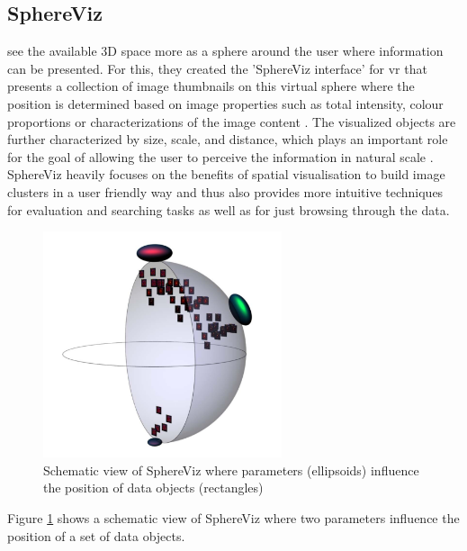 
\subsection{SphereViz}

\cite{Soldati2007} see the available 3D space more as a sphere around the user where information can be presented. For this, they created the 'SphereViz interface' for \gls{vr} that presents a collection of image thumbnails on this virtual sphere where the position is determined based on image properties such as total intensity, colour proportions or characterizations of the image content \citep{Soldati2007}. The visualized objects are further characterized by size, scale, and distance, which plays an important role for the goal of allowing the user to perceive the information in natural scale \citep{Soldati2007}. SphereViz heavily focuses on the benefits of spatial visualisation to build image clusters in a user friendly way and thus also provides more intuitive techniques for evaluation and searching tasks as well as for just browsing through the data.
\begin{figure}[h]
	\begin{center}
		\includegraphics[width=7cm]{03_Figures/05_LitReview/Soldati2007_SphereViz.png}
		\caption[Schematic view of SphereViz where parameters influence the position of data objects]{Schematic view of SphereViz where parameters (ellipsoids) influence the position of data objects (rectangles) \citep{Soldati2007}}
		\label{fig:sphereviz}
	\end{center}
\end{figure} \newline
Figure \ref{fig:sphereviz} shows a schematic view of SphereViz where two parameters influence the position of a set of data objects. \newline
